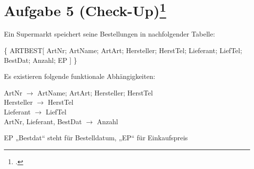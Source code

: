 
\section{Aufgabe 5 (Check-Up)\footcite{db:ab:6}}

\newcommand{\tmptt}[1]{%
  {%
    \small%
    \ttfamily%
    \noindent%
    #1
  }
}

Ein Supermarkt speichert seine Bestellungen in nachfolgender Tabelle:

\bigskip

\tmptt{%
  \{
    ARTBEST[
      ArtNr;
      ArtName;
      ArtArt;
      Hersteller;
      HerstTel;
      Lieferant;
      LiefTel;
      BestDat;
      Anzahl;
      EP
    ]
  \}
}

\bigskip

\noindent
Es existieren folgende funktionale Abhängigkeiten:

\bigskip

\tmptt{%
  ArtNr $\rightarrow$ ArtName; ArtArt; Hersteller; HerstTel\\
  Hersteller $\rightarrow$ HerstTel\\
  Lieferant $\rightarrow$ LiefTel\\
  ArtNr, Lieferant, BestDat $\rightarrow$ Anzahl
}

\bigskip
\noindent
EP „Bestdat“ steht für Bestelldatum, „EP“ für Einkaufspreis


